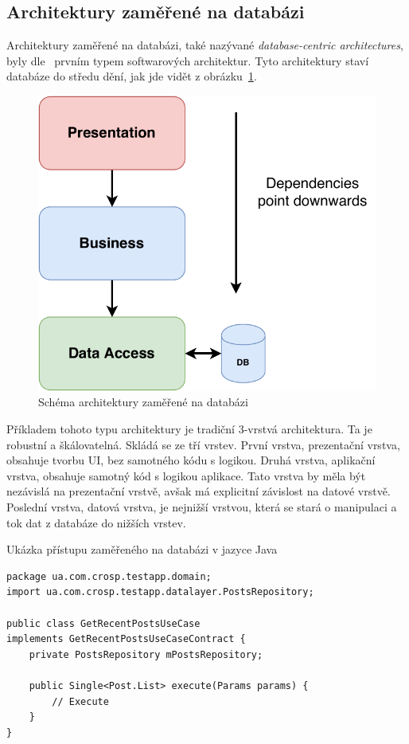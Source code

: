 \subsection{Architektury zaměřené na databázi}

Architektury zaměřené na databázi,
také nazývané \emph{database-centric architectures},
byly dle~\cite{architecture} prvním typem softwarových architektur.
Tyto architektury staví databáze do středu dění,
jak jde vidět z obrázku~\ref{fig:architecture_database}.

\begin{figure}
    \centering
    \includegraphics[width=0.5\linewidth]{assets/technology-research/architecture/database-centric.pdf}
    \caption{Schéma architektury zaměřené na databázi~\cite{architecture}}
    \label{fig:architecture_database}
\end{figure}

Příkladem tohoto typu architektury je tradiční 3-vrstvá architektura.
Ta je robustní a škálovatelná.
Skládá se ze tří vrstev.
První vrstva,
prezentační vrstva,
obsahuje tvorbu UI,
bez samotného kódu s logikou.
Druhá vrstva,
aplikační vrstva,
obsahuje samotný kód s logikou aplikace.
Tato vrstva by měla být nezávislá na prezentační vrstvě,
avšak má explicitní závislost na datové vrstvě.
Poslední vrstva,
datová vrstva,
je nejnižší vrstvou,
která se stará o manipulaci a tok dat z databáze do
nižších vrstev.~\cite{architecture}

\begin{listing}
    \caption{Ukázka přístupu zaměřeného na databázi v jazyce Java~\cite{architecture}}
    \label{code:architecture-database}
    \begin{verbatim}
package ua.com.crosp.testapp.domain;
import ua.com.crosp.testapp.datalayer.PostsRepository;

public class GetRecentPostsUseCase
implements GetRecentPostsUseCaseContract {
    private PostsRepository mPostsRepository;

    public Single<Post.List> execute(Params params) {
        // Execute
    }
}
    \end{verbatim}
\end{listing}

